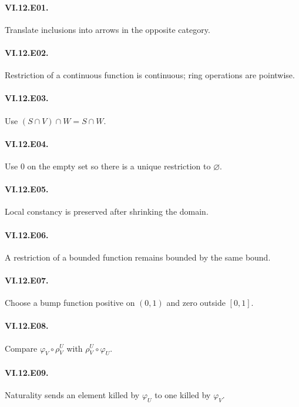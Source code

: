 \paragraph{VI.12.E01.} Translate inclusions into arrows in the opposite category.

\paragraph{VI.12.E02.} Restriction of a continuous function is continuous; ring operations are pointwise.

\paragraph{VI.12.E03.} Use $(S\cap V)\cap W=S\cap W$.

\paragraph{VI.12.E04.} Use $0$ on the empty set so there is a unique restriction to $\varnothing$.

\paragraph{VI.12.E05.} Local constancy is preserved after shrinking the domain.

\paragraph{VI.12.E06.} A restriction of a bounded function remains bounded by the same bound.

\paragraph{VI.12.E07.} Choose a bump function positive on $(0,1)$ and zero outside $[0,1]$.

\paragraph{VI.12.E08.} Compare $\varphi_V\circ\rho^U_V$ with $\rho^U_V\circ\varphi_U$.

\paragraph{VI.12.E09.} Naturality sends an element killed by $\varphi_U$ to one killed by $\varphi_V$.

